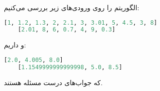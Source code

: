 \documentclass[]{article}
\begin{document}
الگوریتم را روی ورودی‌های زیر بررسی می‌کنیم:
\begin{latin}
\begin{lstlisting}[language=python]
    [1, 1.2, 1.3, 2, 2.1, 3, 3.01, 5, 4.5, 3, 8]
    [2.01, 8, 6, 0.7, 4, 9, 0.3]
\end{lstlisting}
\end{latin}
و داریم:
\begin{latin}
\begin{lstlisting}[language=python]
    [2.0, 4.005, 8.0]
    [1.1549999999999998, 5.0, 8.5]
\end{lstlisting}
\end{latin}
که جواب‌های درست مسئله هستند.
\end{document}
